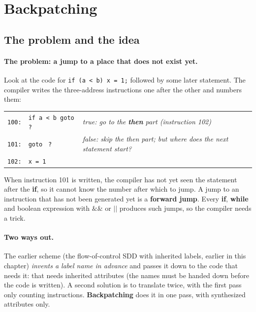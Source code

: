 \documentclass[11pt,a4paper]{article}
\begin{document}
\section{Backpatching}
\label{sec:backpatch}

\providecommand{\blk}{\textcolor{red!70!black}{\texttt{\_}}}
\providecommand{\fv}[1]{\textcolor{green!45!black}{\textbf{\texttt{#1}}}}

\subsection{The problem and the idea}

\paragraph{The problem: a jump to a place that does not exist yet.} Look at the code for \texttt{if (a < b) x = 1;} followed by some later statement. The compiler writes the three-address instructions one after the other and numbers them:
\begin{center}
\begin{tabular}{@{}l l l@{}}
\texttt{100:} & \texttt{if a < b goto } \texttt{?} & \emph{true: go to the \textbf{then} part (instruction 102)} \\
\texttt{101:} & \texttt{goto } \texttt{?} & \emph{false: skip the then part; but where does the next statement start?} \\
\texttt{102:} & \texttt{x = 1} & \\
\end{tabular}
\end{center}
When instruction 101 is written, the compiler has not yet seen the statement after the \textbf{if}, so it cannot know the number after which to jump. A jump to an instruction that has not been generated yet is a \textbf{forward jump}. Every \textbf{if}, \textbf{while} and boolean expression with $\&\&$ or $||$ produces such jumps, so the compiler needs a trick.

\paragraph{Two ways out.} The earlier scheme (the flow-of-control SDD with inherited labels, earlier in this chapter) \emph{invents a label name in advance} and passes it down to the code that needs it: that needs inherited attributes (the names must be handed down before the code is written). A second solution is to translate twice, with the first pass only counting instructions. \textbf{Backpatching} does it in one pass, with synthesized attributes only.
\end{document}
